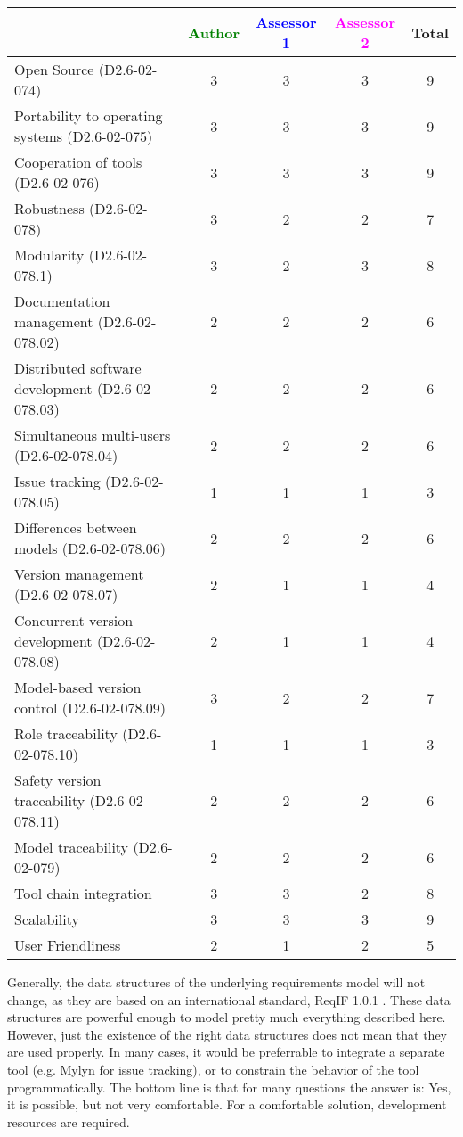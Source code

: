 \begin{tabular}{|l | c | c | c | c|}
\hline
& \textcolor{green}{Author} & \textcolor{blue}{Assessor 1} & \textcolor{magenta}{Assessor 2} & Total \\
\hline
Open Source (D2.6-02-074) & 3 & 3 & 3 & 9 \\
\hline
Portability to operating systems (D2.6-02-075) & 3 & 3 & 3 & 9 \\
\hline
Cooperation of tools (D2.6-02-076) & 3 & 3 & 3 & 9 \\
\hline
Robustness (D2.6-02-078) & 3 & 2 & 2 & 7 \\
\hline
Modularity (D2.6-02-078.1) & 3 & 2 & 3 & 8 \\
\hline
Documentation management (D2.6-02-078.02) & 2 & 2 & 2 & 6 \\
\hline
Distributed software development (D2.6-02-078.03)  & 2 & 2 & 2 & 6 \\
\hline
Simultaneous multi-users (D2.6-02-078.04)   & 2 & 2 & 2 & 6 \\
\hline
Issue tracking (D2.6-02-078.05) & 1 & 1 & 1 & 3 \\
\hline
Differences between models (D2.6-02-078.06) & 2 & 2 & 2 & 6 \\
\hline
Version management (D2.6-02-078.07) & 2 & 1 & 1 & 4 \\
\hline
Concurrent version development (D2.6-02-078.08) & 2 & 1 & 1 & 4 \\
\hline
Model-based version control (D2.6-02-078.09) & 3 & 2 & 2 & 7 \\
\hline
Role traceability (D2.6-02-078.10) & 1 & 1 & 1 & 3 \\
\hline
Safety version traceability (D2.6-02-078.11) & 2 & 2 & 2 & 6 \\
\hline
Model traceability (D2.6-02-079) & 2 & 2 & 2 & 6 \\
\hline
Tool chain integration & 3 & 3 & 2 & 8 \\
\hline
Scalability & 3 & 3 & 3 & 9 \\
\hline
User Friendliness & 2 & 1 & 2 & 5 \\
\hline
\end{tabular}

\begin{author_comment}
Generally, the data structures of the underlying requirements model will not change, as they are based on an international standard, ReqIF 1.0.1 \cite{omg_requirements_2011}.  These data structures are powerful enough to model pretty much everything described here.  However, just the existence of the right data structures does not mean that they are used properly.  In many cases, it would be preferrable to integrate a separate tool (e.g. Mylyn for issue tracking), or to constrain the behavior of the tool programmatically.  The bottom line is that for many questions the answer is: Yes, it is possible, but not very comfortable.  For a comfortable solution, development resources are required.
\end{author_comment}

